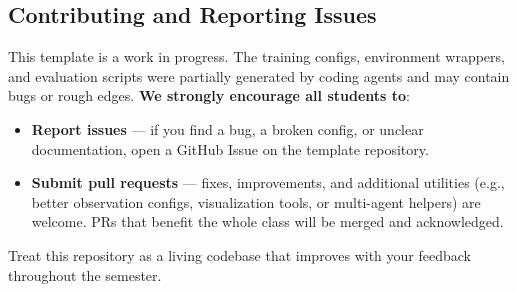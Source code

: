 \documentclass{article}
\begin{document}
\subsection{Contributing and Reporting Issues}

This template is a work in progress. The training configs, environment wrappers, and evaluation scripts were partially generated by coding agents and may contain bugs or rough edges. \textbf{We strongly encourage all students to}:
\begin{itemize}
    \item \textbf{Report issues} --- if you find a bug, a broken config, or unclear documentation, open a GitHub Issue on the template repository.
    \item \textbf{Submit pull requests} --- fixes, improvements, and additional utilities (e.g., better observation configs, visualization tools, or multi-agent helpers) are welcome. PRs that benefit the whole class will be merged and acknowledged.
\end{itemize}

Treat this repository as a living codebase that improves with your feedback throughout the semester.

{


}
\end{document}

